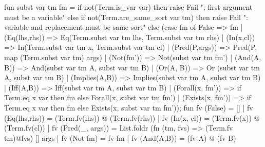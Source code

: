 \nwenddocs{}\endmoddef\nwstartdeflinemarkup{}\nwenddeflinemarkup
fun subst var tm fm =
  if not(Term.is_var var)
  then raise Fail ": first argument must be a variable"
  else if not(Term.are_same_sort var tm)
  then raise Fail ": variable and replacement must be same sort"
  else (case fm of
    False => fm
  | (Eq(lhs,rhs)) => Eq(Term.subst var tm lhs, Term.subst var tm rhs)
  | (In(x,cl)) => In(Term.subst var tm x, Term.subst var tm cl)
  | (Pred(P,args)) => Pred(P, map (Term.subst var tm) args)
  | (Not(fm')) => Not(subst var tm fm')
  | (And(A, B)) => And(subst var tm A, subst var tm B)
  | (Or(A, B)) => Or (subst var tm A, subst var tm B)
  | (Implies(A,B)) => Implies(subst var tm A, subst var tm B)
  | (Iff(A,B)) => Iff(subst var tm A, subst var tm B)
  | (Forall(x, fm')) => if Term.eq x var
                        then fm
                        else Forall(x, subst var tm fm')
  | (Exists(x, fm')) => if Term.eq x var
                        then fm
                        else Exists(x, subst var tm fm'));
\eatline
{}\nwendcode{}\nwdocspar
\nwenddocs{}\endmoddef\nwstartdeflinemarkup{}\nwenddeflinemarkup
fun fv (False) = []
  | fv (Eq(lhs,rhs)) = (Term.fv(lhs)) @ (Term.fv(rhs))
  | fv (In(x, cl)) = (Term.fv(x)) @ (Term.fv(cl))
  | fv (Pred(_, args)) = List.foldr (fn (tm, fvs) => (Term.fv tm)@fvs)
                                    []
                                    args 
  | fv (Not fm) = fv fm
  | fv (And(A,B)) = (fv A) @ (fv B)
